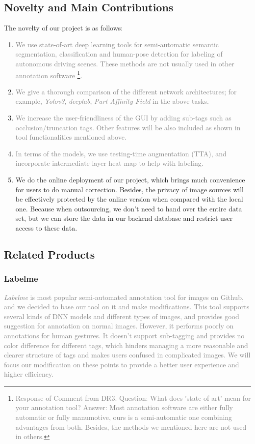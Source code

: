 \subsection{Novelty and Main Contributions}
The novelty of our project is as follows:
\begin{enumerate}
    \item \textcolor{gray}{We use state-of-art deep learning tools for semi-automatic semantic segmentation, classification and human-pose detection for labeling of autonomous driving scenes. These methods are not usually used in other annotation software} \footnote{\textcolor{gray}{Response of Comment from DR3. Question: What does 'state-of-art' mean for your annotation tool? Answer: Most annotation software are either fully automatic or fully manumotive, ours is a semi-automatic one combining advantages from both. Besides, the methods we mentioned here are not used in others.}}.
    \item \textcolor{gray}{We give a thorough comparison of the different network architectures; for example, \emph{Yolov3}, \emph{deeplab}, \emph{Part Affinity Field} in the above tasks.}
    \item \textcolor{gray}{We increase the user-friendliness of the GUI by adding sub-tags such as occlusion/truncation tags. Other features will be also included as shown in tool functionalities mentioned above. }
    \item \textcolor{gray}{In terms of the models, we use testing-time augmentation (TTA), and incorporate intermediate layer heat map to help with labeling. }
    \item We do the online deployment of our project, which brings much convenience for users to do manual correction. Besides, the privacy of image sources will be effectively protected by the online version when compared with the local one. Because when outsourcing, we don't need to hand over the entire data set, but we can store the data in our backend database and restrict user access to these data.
    
\end{enumerate}
    
\subsection{Related Products}

\subsubsection{Labelme}
\textcolor{gray}{\textit{Labelme}\cite{labelme} is most popular semi-automated annotation tool for images on Github, and we decided to base our tool on it and make modifications. This tool supports several kinds of DNN models and different types of images, and provides good suggestion for annotation on normal images. However, it performs poorly on annotations for human gestures. It doesn't support sub-tagging and provides no color difference for different tags, which hinders managing a more reasonable and clearer structure of tags and makes users confused in complicated images. We will focus our modification on these points to provide a better user experience and higher efficiency. }


